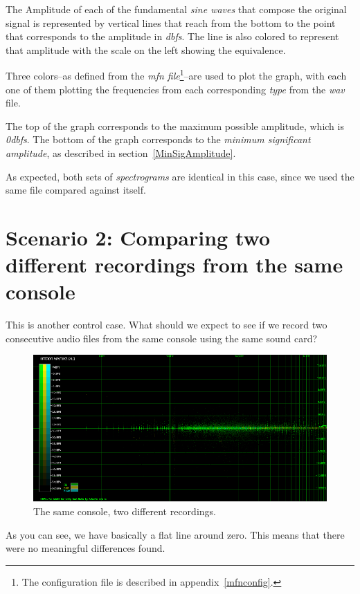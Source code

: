 \documentclass[10pt,a4paper]{report}
\newcommand{\ac}[1]{\textit{\mbox{\acrshort{#1}}}}
\newcommand{\db}[1]{\textit{\mbox{#1\acrshort{dbfs}}}}
\begin{document}
The Amplitude of each of the fundamental \textit{sine waves} that compose the original signal is represented by vertical lines that reach from the bottom to the point that corresponds to the amplitude in \ac{dbfs}. The line is also colored to represent that amplitude with the scale on the left showing the equivalence.

Three colors--as defined from the \textit{mfn file}\footnote{The configuration file is described in appendix~\ref{mfnconfig}.}--are used to plot the graph, with each one of them plotting the frequencies from each corresponding \textit{type} from the \ac{wav} file.

The top of the graph corresponds to the maximum possible amplitude, which is \db{0}. The bottom of the graph corresponds to the \textit{minimum significant amplitude}, as described in section~\ref{MinSigAmplitude}.

As expected, both sets of \textit{spectrograms} are identical in this case, since we used the same file compared against itself.

\section{Scenario 2: Comparing two different recordings from the same console}
\label{scenario2}
This is another control case. What should we expect to see if we record two consecutive audio files from the same console using the same sound card?

\begin{figure}[H]
	\centering
	\includegraphics[width=1\linewidth]{images/interpretation/Plot2-Sameconsole.png}
	\caption[Same console compared]{The same console, two different recordings.}
	\label{fig:plot2-sameconsole}
\end{figure}

As you can see, we have basically a flat line around zero. This means that there were no meaningful differences found. 
\end{document}
